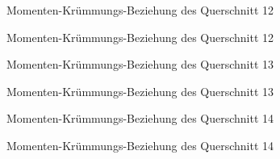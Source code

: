 \documentclass[
  11pt,
  letterpaper,
]{scrreprt}
\begin{document}
\begin{figure}[H]


\caption{\label{fig-qs_12}Momenten-Krümmungs-Beziehung des Querschnitt
12}

\end{figure}%

\begin{figure}[H]


\caption{\label{fig-m_chi_12}Momenten-Krümmungs-Beziehung des
Querschnitt 12}

\end{figure}%

\begin{figure}[H]


\caption{\label{fig-qs_13}Momenten-Krümmungs-Beziehung des Querschnitt
13}

\end{figure}%

\begin{figure}[H]


\caption{\label{fig-m_chi_13}Momenten-Krümmungs-Beziehung des
Querschnitt 13}

\end{figure}%

\begin{figure}[H]


\caption{\label{fig-qs_14}Momenten-Krümmungs-Beziehung des Querschnitt
14}

\end{figure}%

\begin{figure}[H]


\caption{\label{fig-m_chi_14}Momenten-Krümmungs-Beziehung des
Querschnitt 14}

\end{figure}%
\end{document}
